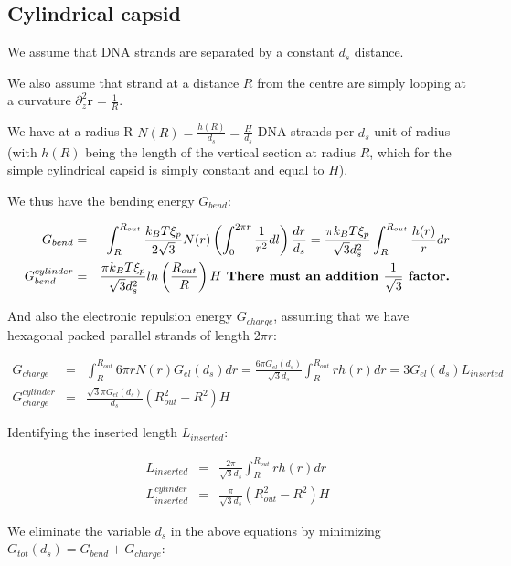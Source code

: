 \documentclass{article}
\begin{document}
\subsection{Cylindrical capsid}

We assume that DNA strands are separated by a constant $d_s$ distance.

We also assume that strand at a distance $R$ from the centre are simply looping at a curvature $\partial_z^2 \mathbf{r} = \frac{1}{R}$.

We have at a radius R $N(R) = \frac{h(R)}{d_s} = \frac{H}{d_s} $ DNA strands per $d_s$ unit of radius (with $h(R)$ being the length of the vertical section at radius $R$, which for the simple cylindrical capsid is simply constant and equal to $H$).

We thus have the bending energy $G_{bend}$:

\begin{eqnarray}
    G_{bend} & = & \int_{R}^{R_{out}} \frac{k_B T \xi_p}{2\sqrt{3}} N(r)  \left( \int_{0}^{2\pi r} \frac{1}{r^2} dl \right) \frac{dr}{d_s} =  \frac{\pi k_B T \xi_p}{\sqrt{3}d_s^2} \int_{R}^{R_{out}} \frac{h(r)}{r} dr \\
    G_{bend}^{cylinder} & = & \frac{\pi k_B T \xi_p}{\sqrt{3}d_s^2} ln \left( \frac{R_{out}}{R} \right) H \textnormal{\bf ~There must an addition $\frac{1}{\sqrt{3}}$ factor.}
\end{eqnarray}

And also the electronic repulsion energy $G_{charge}$, assuming that we have hexagonal packed parallel strands of length $2\pi r$:

\begin{eqnarray}
    G_{charge} & = & \int_{R}^{R_{out}} 6 \pi r N(r) G_{el}(d_s) dr = \frac{6 \pi G_{el}(d_s)}{\sqrt{3}d_s} \int_{R}^{R_{out}} r h(r) dr = 3 G_{el}(d_s) L_{inserted} \\
    G_{charge}^{cylinder} & = & \frac{\sqrt{3} \pi G_{el}(d_s)}{d_s} \left( R_{out}^2 - R^2 \right) H
\end{eqnarray}

Identifying the inserted length $L_{inserted}$:

\begin{eqnarray}
    L_{inserted} & = & \frac{2 \pi}{\sqrt{3}d_s} \int_{R}^{R_{out}} r h(r) dr \\
    L_{inserted}^{cylinder} & = & \frac{\pi }{\sqrt{3}d_s} \left( R_{out}^2 - R^2 \right) H
\end{eqnarray}

We eliminate the variable $d_s$ in the above equations by minimizing $G_{tot}(d_s) = G_{bend} + G_{charge}$:
\end{document}
